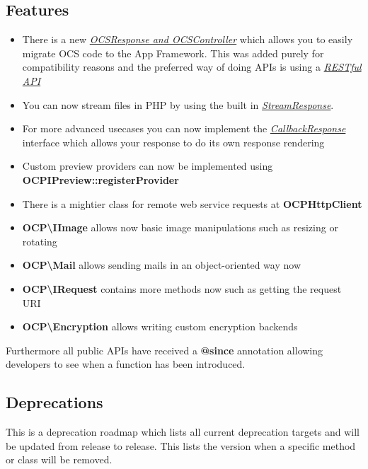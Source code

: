 \documentclass[letterpaper,10pt,english]{sphinxmanual}
\begin{document}
\subsection{Features}
\label{app/changelog:features}\begin{itemize}
\item {} 
There is a new {\hyperref[app/controllers::doc]{\emph{OCSResponse and OCSController}}} which allows you to easily migrate OCS code to the App Framework. This was added purely for compatibility reasons and the preferred way of doing APIs is using a {\hyperref[app/api::doc]{\emph{RESTful API}}}

\item {} 
You can now stream files in PHP by using the built in {\hyperref[app/controllers::doc]{\emph{StreamResponse}}}.

\item {} 
For more advanced usecases you can now implement the {\hyperref[app/controllers::doc]{\emph{CallbackResponse}}} interface which allows your response to do its own response rendering

\item {} 
Custom preview providers can now be implemented using \textbf{OCPIPreview::registerProvider}

\item {} 
There is a mightier class for remote web service requests at \textbf{OCPHttpClient}

\item {} 
\textbf{OCP\textbackslash{}IImage} allows now basic image manipulations such as resizing or rotating

\item {} 
\textbf{OCP\textbackslash{}Mail} allows sending mails in an object-oriented way now

\item {} 
\textbf{OCP\textbackslash{}IRequest} contains more methods now such as getting the request URI

\item {} 
\textbf{OCP\textbackslash{}Encryption} allows writing custom encryption backends

\end{itemize}

Furthermore all public APIs have received a \textbf{@since} annotation allowing developers to see when a function has been introduced.


\subsection{Deprecations}
\label{app/changelog:deprecations}
This is a deprecation roadmap which lists all current deprecation targets and will be updated from release to release. This lists the version when a specific method or class will be removed.
\end{document}
